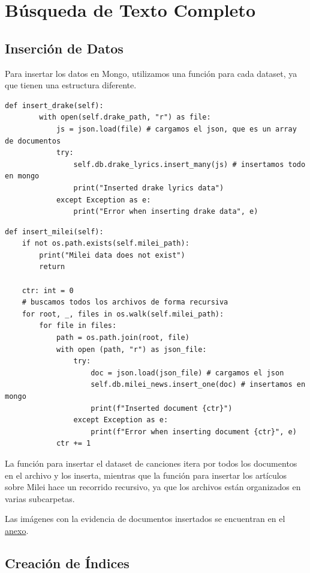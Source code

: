 \section{Búsqueda de Texto Completo}

\subsection{Inserción de Datos}

Para insertar los datos en Mongo, utilizamos una función para cada dataset, ya que tienen una
estructura diferente.

\begin{verbatim}
def insert_drake(self):
        with open(self.drake_path, "r") as file:
            js = json.load(file) # cargamos el json, que es un array de documentos
            try:
                self.db.drake_lyrics.insert_many(js) # insertamos todo en mongo
                print("Inserted drake lyrics data")
            except Exception as e:
                print("Error when inserting drake data", e)
\end{verbatim}

\begin{verbatim}
def insert_milei(self):
    if not os.path.exists(self.milei_path):
        print("Milei data does not exist")
        return
    
    ctr: int = 0
    # buscamos todos los archivos de forma recursiva
    for root, _, files in os.walk(self.milei_path):
        for file in files:
            path = os.path.join(root, file)
            with open (path, "r") as json_file:
                try:
                    doc = json.load(json_file) # cargamos el json
                    self.db.milei_news.insert_one(doc) # insertamos en mongo
                    print(f"Inserted document {ctr}")
                except Exception as e:
                    print(f"Error when inserting document {ctr}", e)
            ctr += 1
\end{verbatim}

La función para insertar el dataset de canciones itera por todos los documentos
en el archivo y los inserta, mientras que la función para insertar los artículos
sobre Milei hace un recorrido recursivo, ya que los archivos están organizados en
varias subcarpetas.

Las imágenes con la evidencia de documentos insertados se encuentran en el \hyperref[insercion]{anexo}.

\subsection{Creación de Índices}

